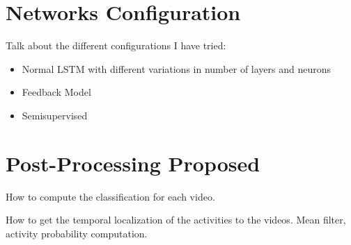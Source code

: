 \section{Networks Configuration}

Talk about the different configurations I have tried:
\begin{itemize}
    \item Normal LSTM with different variations in number of layers and neurons
    \item Feedback Model
    \item Semisupervised
\end{itemize}

\section{Post-Processing Proposed}

How to compute the classification for each video.

How to get the temporal localization of the activities to the videos.
Mean filter, activity probability computation.
